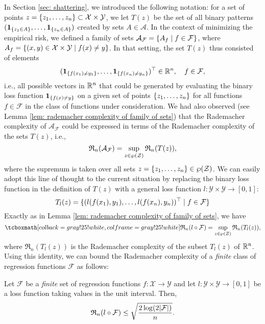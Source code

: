 In Section \ref{sec: shattering}, we introduced the following notation: for a set of points $z = \set{z_1, \dots, z_n} \subset \mathcal{X} \times \mathcal{Y}$, we let $T(z)$ be the set of all binary patterns $(\indSet{z_1 \in A}, \dots, \indSet{z_n \in A})$ created by sets $A \in \mathcal{A}$. In the context of minimizing the empirical risk, we defined a family of sets $\mathcal{A}_{\mathcal{F}} = \set{A_f \with f \in \mathcal{F}}$, where $A_f = \set{(x, y) \in \mathcal{X} \times \mathcal{Y} \with f(x) \neq y}$. In that setting, the set $T(z)$ thus consisted of elements
\[
    (\indSet{f(x_1) \neq y_1}, \dots, \indSet{f(x_n) \neq y_n})^{\top} \in \R^n, \quad f \in \mathcal{F},
\]
i.e., all possible vectors in $\mathbb{R}^n$ that could be generated by evaluating the binary loss function $\indSet{f(x) \neq y}$ on a given set of points $\set{z_1, \dots, z_n}$ for all functions $f \in \mathcal{F}$ in the class of functions under consideration. We had also observed (see Lemma \ref{lem: rademacher complexity of family of sets}) that the Rademacher complexity of $\mathcal{A}_{\mathcal{F}}$ could be expressed in terms of the Rademacher complexity of the sets $T(z)$, i.e.,
\[
    \mathfrak{R}_n(\mathcal{A}_{\mathcal{F}}) = \sup_{z \in \operatorname{\wp}(\mathcal{Z})} \mathfrak{R}_n(T(z)),
\]
where the supremum is taken over all sets $z = \set{z_1, \dots, z_n} \in \power(\mathcal{Z})$. We can easily adopt this line of thought to the current situation by replacing the binary loss function in the definition of $T(z)$ with a general loss function $l \colon \mathcal{Y} \times \mathcal{Y} \to [0, 1]$:
\begin{equation}
    T_l(z) = \{(l(f(x_1), y_1), \dots, l(f(x_n), y_n))^{\top} \mathrel{|} f \in \mathcal{F}\}
\end{equation}
Exactly as in Lemma \ref{lem: rademacher complexity of family of sets}, we have
\begin{equation}
\label{eq: rademacher complexity for general loss}
    \highlightMath{
        \mathfrak{R}_n(l \circ \mathcal{F}) = \sup_{z \in \power(\mathcal{Z})} \mathfrak{R}_n(T_l(z)),
    }
\end{equation}
where $\mathfrak{R}_n(T_l(z))$ is the Rademacher complexity of the subset $T_l(z)$ of $\mathbb{R}^n$. Using this identity, we can bound the Rademacher complexity of a \emph{finite} class of regression functions $\mathcal{F}$ as follows:

\begin{proposition}
\label{prop: bound on rademacher complexity for general loss}
Let $\mathcal{F}$ be a \emph{finite} set of regression functions $f \colon \mathcal{X} \to \mathcal{Y}$ and let $l \colon \mathcal{Y} \times \mathcal{Y} \to [0, 1]$ be a loss function taking values in the unit interval. Then,
\[
    \mathfrak{R}_n(l \circ \mathcal{F}) \leq \sqrt{\frac{2 \log(2 \abs{\mathcal{F}})}{n}}.
\]
\end{proposition}

